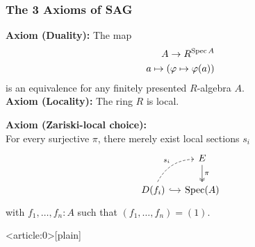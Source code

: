 \documentclass{beamer}
\begin{document}
\begin{frame}
  \frametitle{The 3 Axioms of SAG}
    \textbf{Axiom (Duality):}
    The map
    \begin{align*}
      A \to R^{\operatorname{Spec} A} \\
      a\mapsto (\varphi\mapsto \varphi(a))
    \end{align*}
    is an equivalence
    for any finitely presented $R$-algebra $A$. \\
  \pause
  \vspace{1.5mm}
  \textbf{Axiom (Locality):} The ring $R$ is local.

  \vspace{1.5mm}
  \textbf{Axiom (Zariski-local choice):}\\
  For every surjective $\pi$, there merely exist local sections $s_i$
  \[ \begin{tikzcd}[ampersand replacement=\&, column sep=small]
    \& E \ar[d, two heads, "\pi"] \\
    D(f_i) \ar[r, hook] \ar[ur, bend left, dashed, "s_i"] \& \Spec(A)
  \end{tikzcd} \]
  with $f_1, \dots, f_n : A$ such that $(f_1,\dots,f_n)=(1)$.
\end{frame}

{ %
    \begin{frame}<article:0>[plain]
     \end{frame}
}
\end{document}
